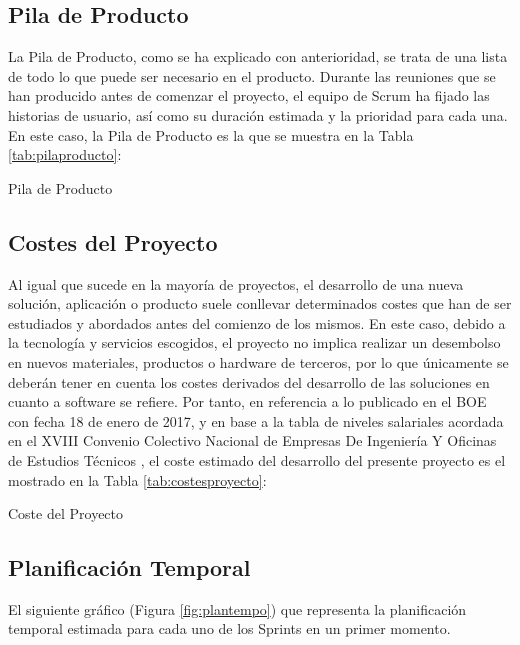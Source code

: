 \subsection{Pila de Producto}
La Pila de Producto, como se ha explicado con anterioridad, se trata de una lista de todo lo que puede ser necesario en el producto. Durante las reuniones que se han producido antes de comenzar el proyecto, el equipo de Scrum ha fijado las historias de usuario, así como su duración estimada y la prioridad para cada una. En este caso, la Pila de Producto es la que se muestra en la Tabla \ref{tab:pilaproducto}:

\begin{table}[!htbp]
	\centering
	{\small
		
	}
	\caption[Pila de Producto]
	{Pila de Producto}
	\label{tab:pilaproducto}
\end{table}

\clearpage

\subsection{Costes del Proyecto}
Al igual que sucede en la mayoría de proyectos, el desarrollo de una nueva solución, aplicación o producto suele conllevar determinados costes que han de ser estudiados y abordados antes del comienzo de los mismos. En este caso, debido a la tecnología y servicios escogidos, el proyecto no implica realizar un desembolso en nuevos materiales, productos o hardware de terceros, por lo que únicamente se deberán tener en cuenta los costes derivados del desarrollo de las soluciones en cuanto a software se refiere. Por tanto, en referencia a lo publicado en el \acf{BOE} con fecha 18 de enero de 2017, y en base a la tabla de niveles salariales acordada en el XVIII Convenio Colectivo Nacional de Empresas De Ingeniería Y Oficinas de Estudios Técnicos \cite{BOE2017}, el coste estimado del desarrollo del presente proyecto es el mostrado en la Tabla \ref{tab:costesproyecto}:

\begin{table}[!htbp]
	\centering
	{\small
		
	}
	\caption[Coste del Proyecto]
	{Coste del Proyecto}
	\label{tab:costesproyecto}
\end{table}

\subsection{Planificación Temporal}
El siguiente gráfico (Figura \ref{fig:plantempo}) que representa la planificación temporal estimada para cada uno de los Sprints en un primer momento.

